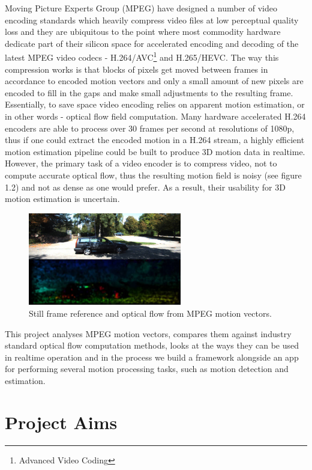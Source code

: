 \documentclass[11pt,english]{report}
\begin{document}
Moving Picture Experts Group (MPEG) have designed a number of video encoding standards which heavily compress video files at low perceptual quality loss and they are ubiquitous to the point where most commodity hardware dedicate part of their silicon space for accelerated encoding and decoding of the latest MPEG video codecs - H.264/AVC\footnote{Advanced Video Coding}\cite{h264} and H.265/HEVC\cite{h265}. The way this compression works is that blocks of pixels get moved between frames in accordance to encoded motion vectors and only a small amount of new pixels are encoded to fill in the gaps and make small adjustments to the resulting frame. Essentially, to save space video encoding relies on apparent motion estimation, or in other words - optical flow field computation. Many hardware accelerated H.264 encoders are able to process over 30 frames per second at resolutions of 1080p, thus if one could extract the encoded motion in a H.264 stream, a highly efficient motion estimation pipeline could be built to produce 3D motion data in realtime. However, the primary task of a video encoder is to compress video, not to compute accurate optical flow, thus the resulting motion field is noisy\cite{1334181} (see figure 1.2) and not as dense as one would prefer. As a result, their usability for 3D motion estimation is uncertain.

\begin{figure}[!ht]
	\centering
	\includegraphics[width=190pt]{docs/report/mpeg-mvecs.jpg}
	\caption{\centering Still frame reference and optical flow from MPEG motion vectors.}
\end{figure}

This project analyses MPEG motion vectors, compares them against industry standard optical flow computation methods, looks at the ways they can be used in realtime operation and in the process we build a framework alongside an app for performing several motion processing tasks, such as motion detection and estimation.

\section{Project Aims}
\end{document}
